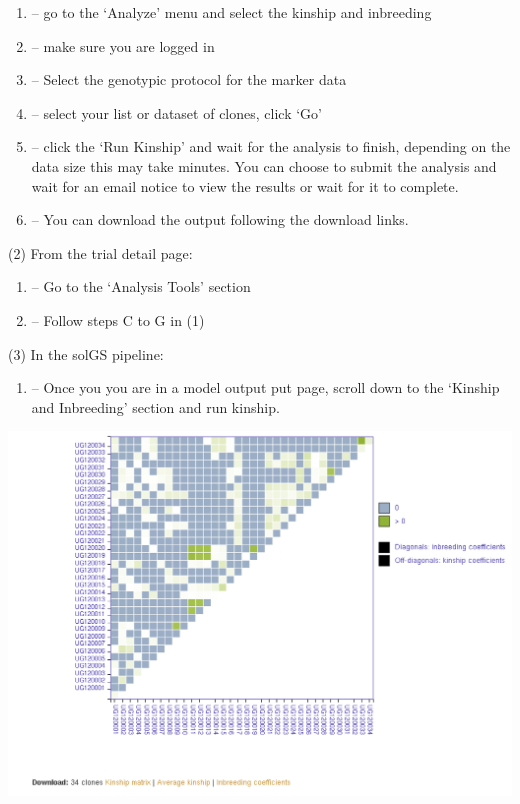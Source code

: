 \documentclass[
  12pt,
]{book}
\providecommand{\tightlist}{%
  \setlength{\itemsep}{0pt}\setlength{\parskip}{0pt}}
\begin{document}
\begin{enumerate}
\def\labelenumi{(\Alph{enumi})}
\item
  -- go to the `Analyze' menu and select the kinship and inbreeding
\item
  -- make sure you are logged in
\item
  -- Select the genotypic protocol for the marker data
\item
  -- select your list or dataset of clones, click `Go'
\item
  -- click the `Run Kinship' and wait for the analysis to finish, depending on the data size this may take minutes. You can choose to submit the analysis and wait for an email notice to view the results or wait for it to complete.
\item
  -- You can download the output following the download links.
\end{enumerate}

(2) From the trial detail page:

\begin{enumerate}
\def\labelenumi{(\Alph{enumi})}
\item
  -- Go to the `Analysis Tools' section
\item
  -- Follow steps C to G in (1)
\end{enumerate}

(3) In the solGS pipeline:

\begin{enumerate}
\def\labelenumi{(\Alph{enumi})}
\tightlist
\item
  -- Once you you are in a model output put page, scroll down to the `Kinship and Inbreeding' section and run kinship.
\end{enumerate}

\begin{center}\includegraphics[width=0.95\linewidth]{assets/images/kinship-inbreeding} \end{center}
\end{document}
